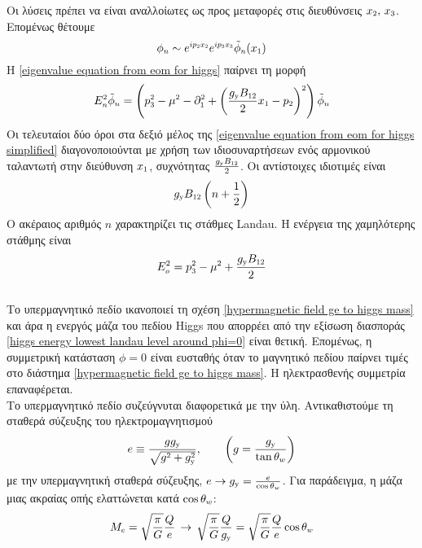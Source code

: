 Οι λύσεις πρέπει να είναι αναλλοίωτες ως προς μεταφορές στις διευθύνσεις $x\subscr{2},\,x\subscr{3}$. 
Επομένως θέτουμε 
\begin{equation}
    \phi\subscr{n}\sim e\superscr{ip\subscr{2}x\subscr{2}}e\superscr{ip\subscr{3}x\subscr{3}}\Tilde{\phi}\subscr{n}(x\subscr{1})
\end{equation}
Η \eqref{eigenvalue equation from eom for higgs} παίρνει τη μορφή
\begin{equation}\label{eigenvalue equation from eom for higgs simplified}
    E\subscr{n}\superscr{2}\Tilde{\phi}\subscr{n}=\left(p\subscr{3}\superscr{2}-\mu\superscr{2}-\partial\subscr{1}\superscr{2}+\left(\frac{g\subscr{\y}B\subscr{12}}{2}x\subscr{1}-p\subscr{2}\right)\superscr{2}\right)\Tilde{\phi}\subscr{n}
\end{equation}
Οι τελευταίοι δύο όροι στα δεξιό μέλος της \eqref{eigenvalue equation from eom for higgs simplified} διαγονοποιούνται με χρήση των ιδιοσυναρτήσεων ενός αρμονικού ταλαντωτή στην διεύθυνση $x\subscr{1}$, συχνότητας $\frac{g\subscr{\y}B\subscr{12}}{2}$. Οι αντίστοιχες ιδιοτιμές είναι
\begin{equation}
    g\subscr{\y}B\subscr{12}\left( n+\frac{1}{2} \right)
\end{equation}
Ο ακέραιος αριθμός $n$ χαρακτηρίζει τις στάθμες Landau. Η ενέργεια της χαμηλότερης στάθμης είναι
\begin{equation}\label{higgs energy lowest landau level around phi=0}
    E\superscr{2}\subscr{o}=p\subscr{3}\superscr{2}-\mu\superscr{2}+\frac{g\subscr{\y}B\subscr{12}}{2}
\end{equation}
\\

Το υπερμαγνητικό πεδίο ικανοποιεί τη σχέση \eqref{hypermagnetic field ge to higgs mass} και άρα η ενεργός μάζα του πεδίου Higgs που απορρέει από την εξίσωση διασποράς \eqref{higgs energy lowest landau level around phi=0} είναι θετική. Επομένως, η συμμετρική κατάσταση ${\scriptstyle\phi=0}$ είναι ευσταθής όταν το μαγνητικό πεδίου παίρνει τιμές στο διάστημα \eqref{hypermagnetic field ge to higgs mass}. Η ηλεκτρασθενής συμμετρία επαναφέρεται.\\ 

Το υπερμαγνητικό πεδίο συζεύγνυται διαφορετικά με την ύλη. Αντικαθιστούμε τη %
σταθερά σύζευξης του ηλεκτρομαγνητισμού
\begin{equation}
    e\equiv \frac{gg\subscr{\y}}{\sqrt{g\superscr{2}+g\subscr{\y}\superscr{2}}},\qquad \left(g=\frac{g\subscr{\y}}{\tan\theta\subscr{w}}\right)
\end{equation}
με την υπερμαγνητική σταθερά σύζευξης, $e\rightarrow g\subscr{\y}=\frac{e}{\cos\theta\subscr{w}}$. Για παράδειγμα, η μάζα μιας ακραίας οπής ελαττώνεται κατά $\cos\theta\subscr{w}$:
\begin{equation}
    M\subscr{e}=\sqrt{\frac{\pi}{G}}\frac{Q}{e}\,\rightarrow\,\sqrt{\frac{\pi}{G}}\frac{Q}{g\subscr{\y}}=\sqrt{\frac{\pi}{G}}\frac{Q}{e}\cos\theta\subscr{w}
\end{equation}

